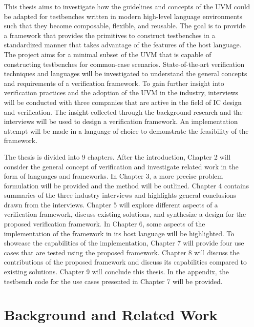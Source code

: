 This thesis aims to investigate how the guidelines and concepts of the UVM could be adapted for testbenches written in modern high-level language environments such
that they become composable, flexible, and reusable. The goal is to provide a framework that provides the primitives to
construct testbenches in a standardized manner that takes advantage of the features of the host language. The project aims for a minimal subset of the UVM that is capable of constructing testbenches for common-case scenarios.
State-of-the-art verification techniques and languages will be investigated to understand the general concepts and
requirements of a verification framework. To gain further insight into verification practices and the adoption of the UVM in
the industry, interviews will be conducted with three companies that are active in the field of IC design and
verification. The insight collected through the background research and the interviews will be used to design a
verification framework. An implementation attempt will be made in a language of choice to demonstrate the feasibility
of the framework.

The thesis is divided into 9 chapters. After the introduction, Chapter 2 will consider the general concept of verification and investigate related work in the form of languages and frameworks. In Chapter 3, a more precise problem formulation will be provided and the method will be outlined. Chapter 4 contains summaries of the three industry interviews and highlights general conclusions drawn from the interviews. Chapter 5 will explore different aspects of a verification framework, discuss existing solutions, and synthesize a design for the proposed verification framework. In Chapter 6, some aspects of the implementation of the framework in its host language will be highlighted. To showcase the capabilities of the implementation, Chapter 7 will provide four use cases that are tested using the proposed framework. Chapter 8 will discuss the contributions of the proposed framework and discuss its capabilities compared to existing solutions. Chapter 9 will conclude this thesis. In the appendix, the testbench code for the use cases presented in Chapter 7 will be provided.

\chapter{Background and Related Work} %
\label{ch:background}

